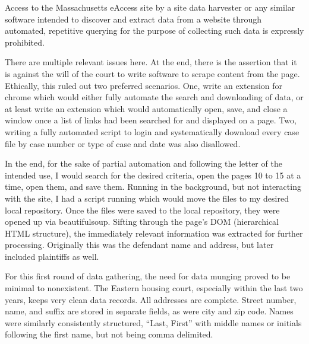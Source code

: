Access to the Massachusetts eAccess site by a site data harvester or any similar software intended to discover and extract data from a website through automated, repetitive querying for the purpose of collecting such data is expressly prohibited. \par

There are multiple relevant issues here.  At the end, there is the assertion that it is against the will of the court to write software to scrape content from the page.  Ethically, this ruled out two preferred scenarios.  One, write an extension for chrome which would either fully automate the search and downloading of data, or at least write an extension which would automatically open, save, and close a window once a list of links had been searched for and displayed on a page.  Two, writing a fully automated script to login and systematically download every case file by case number or type of case and date was also disallowed. \par

In the end, for the sake of partial automation and following the letter of the intended use, I would search for the desired criteria, open the pages 10 to 15 at a time, open them, and save them.  Running in the background, but not interacting with the site, I had a script running which would move the files to my desired local repository.  Once the files were saved to the local repository, they were opened up via beautifulsoup.  Sifting through the page’s DOM (hierarchical HTML structure), the immediately relevant information was extracted for further processing.  Originally this was the defendant name and address, but later included plaintiffs as well. \par

For this first round of data gathering, the need for data munging proved to be minimal to nonexistent.  The Eastern housing court, especially within the last two years, keeps very clean data records.  All addresses are complete.  Street number, name, and suffix are stored in separate fields, as were city and zip code.  Names were similarly consistently structured, “Last, First” with middle names or initials following the first name, but not being comma delimited. \par

